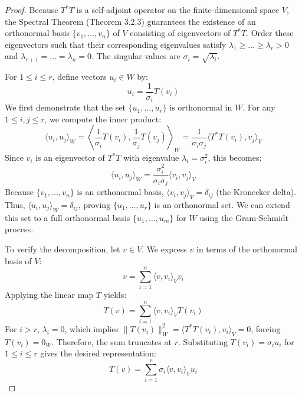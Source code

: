 \begin{proof}
Because $T^*T$ is a self-adjoint operator on the finite-dimensional space $V$, the Spectral Theorem (Theorem 3.2.3) guarantees the existence of an orthonormal basis $\{v_1, \dots, v_n\}$ of $V$ consisting of eigenvectors of $T^*T$. Order these eigenvectors such that their corresponding eigenvalues satisfy $\lambda_1 \ge \dots \ge \lambda_r > 0$ and $\lambda_{r+1} = \dots = \lambda_n = 0$. The singular values are $\sigma_i = \sqrt{\lambda_i}$.

For $1 \le i \le r$, define vectors $u_i \in W$ by:
$$ u_i = \frac{1}{\sigma_i} T(v_i) $$
We first demonstrate that the set $\{u_1, \dots, u_r\}$ is orthonormal in $W$. For any $1 \le i, j \le r$, we compute the inner product:
$$ \langle u_i, u_j \rangle_W = \left\langle \frac{1}{\sigma_i} T(v_i), \frac{1}{\sigma_j} T(v_j) \right\rangle_W = \frac{1}{\sigma_i \sigma_j} \langle T^*T(v_i), v_j \rangle_V $$
Since $v_i$ is an eigenvector of $T^*T$ with eigenvalue $\lambda_i = \sigma_i^2$, this becomes:
$$ \langle u_i, u_j \rangle_W = \frac{\sigma_i^2}{\sigma_i \sigma_j} \langle v_i, v_j \rangle_V $$
Because $\{v_1, \dots, v_n\}$ is an orthonormal basis, $\langle v_i, v_j \rangle_V = \delta_{ij}$ (the Kronecker delta). Thus, $\langle u_i, u_j \rangle_W = \delta_{ij}$, proving $\{u_1, \dots, u_r\}$ is an orthonormal set. We can extend this set to a full orthonormal basis $\{u_1, \dots, u_m\}$ for $W$ using the Gram-Schmidt process.

To verify the decomposition, let $v \in V$. We express $v$ in terms of the orthonormal basis of $V$:
$$ v = \sum_{i=1}^n \langle v, v_i \rangle_V v_i $$
Applying the linear map $T$ yields:
$$ T(v) = \sum_{i=1}^n \langle v, v_i \rangle_V T(v_i) $$
For $i > r$, $\lambda_i = 0$, which implies $\|T(v_i)\|_W^2 = \langle T^*T(v_i), v_i \rangle_V = 0$, forcing $T(v_i) = 0_W$. Therefore, the sum truncates at $r$. Substituting $T(v_i) = \sigma_i u_i$ for $1 \le i \le r$ gives the desired representation:
$$ T(v) = \sum_{i=1}^r \sigma_i \langle v, v_i \rangle_V u_i $$
\end{proof}

